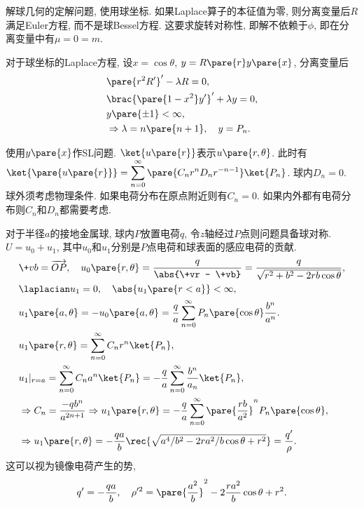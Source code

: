 \documentclass[hidelinks]{ctexart}
\begin{document}
\newpoint{}解球几何的定解问题, 使用球坐标.
\newpoint{}如果Laplace算子的本征值为零, 则分离变量后$R$满足Euler方程, 而不是球Bessel方程.
\newpoint{}这要求旋转对称性, 即解不依赖于$\phi$, 即在分离变量中有$\mu = 0 = m$.
\begin{ex}
    对于球坐标的Laplace方程, 设$x=\cos\theta$, $y = R\pare{r}y\pare{x}$, 分离变量后
    \begin{align*}
        & \pare{r^2R'}' - \lambda R = 0, \\
        & \brac{\pare{1-x^2}y'}' + \lambda y = 0, \\
        & y\pare{\pm 1} < \infty, \\
        & \Rightarrow \lambda = n\pare{n+1},\quad y = P_n.
    \end{align*}
\end{ex}
\newpoint{}使用$y\pare{x}$作SL问题.
\newpoint{}$\ket{u\pare{r}}$表示$u\pare{r,\theta}$.
\newpoint{}此时有$\displaystyle \ket{\pare{u\pare{r}}} = \sum_{n=0}^\infty \pare{C_n r^n D_n r^{-n-1}}\ket{P_n}$.
\newpoint{}球内$D_n = 0$.
\newpoint{}球外须考虑物理条件. 如果电荷分布在原点附近则有$C_n = 0$.
\newpoint{}如果内外都有电荷分布则$C_n$和$D_n$都需要考虑.
\begin{sample}
    \begin{ex}
        对于半径$a$的接地金属球, 球内$P$放置电荷$q$, 令$z$轴经过$P$点则问题具备球对称. $U = u_0 + u_1$, 其中$u_0$和$u_1$分别是$P$点电荷和球表面的感应电荷的贡献.
        \begin{align*}
            & \+vb = \overrightarrow{OP},\quad u_0\pare{r,\theta} = \frac{q}{\abs{\+vr - \+vb}} = \frac{q}{\sqrt{r^2+b^2 - 2rb\cos\theta}}, \\
            & \laplacian u_1 = 0,\quad \abs{u_1\pare{r<a}} < \infty, \\
            & u_1\pare{a,\theta} = -u_0\pare{a,\theta} = \frac{q}{a} \sum_{n=0}^\infty P_n\pare{\cos\theta} \frac{b^n}{a^n}. \\
            & u_1\pare{r,\theta} = \sum_{n=0}^\infty C_n r^n \ket{P_n}, \\
            & u_1\vert_{r=a} = \sum_{n=0}^\infty C_n a^n \ket{P_n} = -\frac{q}{a} \sum_{n=0}^\infty \frac{b^n}{a_n}\ket{P_n}, \\
            & \Rightarrow C_n = \frac{-qb^n}{a^{2n+1}} \Rightarrow u_1\pare{r,\theta} = -\frac{q}{a} \sum_{n=0}^\infty \pare{\frac{rb}{a^2}}^n P_n\pare{\cos\theta},\\
            & \Rightarrow u_1\pare{r,\theta} = -\frac{qa}{b}\rec{\sqrt{a^4/b^2 - 2ra^2/b\cos\theta + r^2}} = \frac{q'}{\rho}.
        \end{align*}
        这可以视为镜像电荷产生的势,
        \[ q' = -\frac{qa}{b},\quad \rho'^2 = \pare{\frac{a^2}{b}}^2 - 2\frac{ra^2}{b}\cos\theta + r^2. \]
    \end{ex}
\end{sample}
\end{document}
